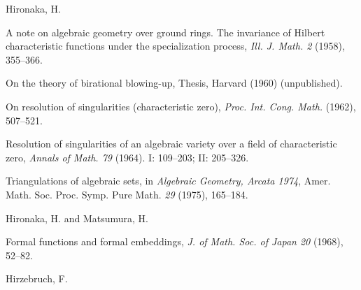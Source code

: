 {\par\vspace{2.15pt}\noindent \hypertarget{bib-477-12}{}Hironaka, H.\par
\noindent\hangindent=25bp\hspace*{6bp}%
A note on algebraic geometry over ground rings. The invariance of Hilbert characteristic functions under the specialization process, \emph{Ill. J. Math. 2} (1958), 355--366.\par
\noindent\hangindent=25bp\hspace*{6bp}%
On the theory of birational blowing-up, Thesis, Harvard (1960) (unpublished).\par
\noindent\hangindent=25bp\hspace*{6bp}%
On resolution of singularities (characteristic zero), \emph{Proc. Int. Cong. Math.} (1962), 507--521.\par
\noindent\hangindent=25bp\hspace*{6bp}%
Resolution of singularities of an algebraic variety over a field of characteristic zero, \emph{Annals of Math. 79} (1964). I: 109--203; II: 205--326.\par
\noindent\hangindent=25bp\hspace*{6bp}%
Triangulations of algebraic sets, in \emph{Algebraic Geometry, Arcata 1974}, Amer. Math. Soc. Proc. Symp. Pure Math. \emph{29} (1975), 165--184.\par
\par\vspace{2.15pt}\noindent \hypertarget{bib-477-17}{}Hironaka, H. and Matsumura, H.\par
\noindent\hangindent=25bp\hspace*{6bp}%
Formal functions and formal embeddings, \emph{J. of Math. Soc. of Japan 20} (1968), 52--82.\par
\par\vspace{2.15pt}\noindent \hypertarget{bib-477-18}{}Hirzebruch, F.\par
\noindent\hangindent=25bp\hspace*{6bp}%
}
